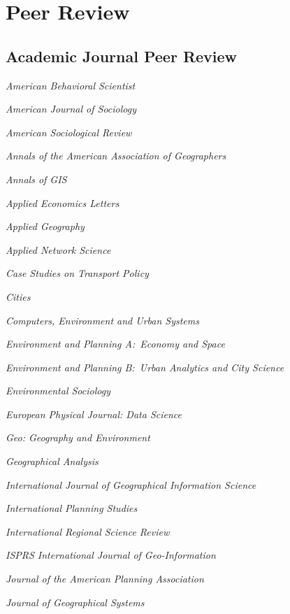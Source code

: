 \documentclass[11pt,letterpaper]{report} %
\newcommand{\listitemspace}{0.25em}
\renewenvironment{itemize}
{
  \begin{list}{}{\setlength{\leftmargin}{0em}
      \setlength{\parskip}{0em}
      \setlength{\itemsep}{\listitemspace}
  \setlength{\parsep}{\listitemspace}}}
  {
\end{list}}
\begin{document}
\section*{Peer Review}

\subsection*{Academic Journal Peer Review}

\begin{itemize}

  \item \textit{American Behavioral Scientist}
  \item \textit{American Journal of Sociology}
  \item \textit{American Sociological Review}
  \item \textit{Annals of the American Association of Geographers}
  \item \textit{Annals of GIS}
  \item \textit{Applied Economics Letters}
  \item \textit{Applied Geography}
  \item \textit{Applied Network Science}
  \item \textit{Case Studies on Transport Policy}
  \item \textit{Cities}
  \item \textit{Computers, Environment and Urban Systems}
  \item \textit{Environment and Planning A:\ Economy and Space}
  \item \textit{Environment and Planning B:\ Urban Analytics and City Science}
  \item \textit{Environmental Sociology}
  \item \textit{European Physical Journal: Data Science}
  \item \textit{Geo: Geography and Environment}
  \item \textit{Geographical Analysis}
  \item \textit{International Journal of Geographical Information Science}
  \item \textit{International Planning Studies}
  \item \textit{International Regional Science Review}
  \item \textit{ISPRS International Journal of Geo-Information}
  \item \textit{Journal of the American Planning Association}
  \item \textit{Journal of Geographical Systems}

\end{itemize}
\end{document}

